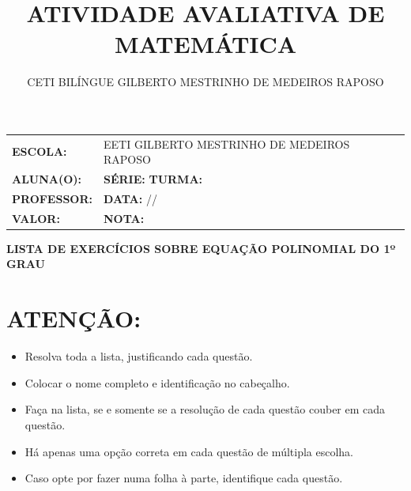 \documentclass[a4paper,12pt]{article}
\title{ATIVIDADE AVALIATIVA DE MATEMÁTICA}
\author{CETI BILÍNGUE GILBERTO MESTRINHO DE MEDEIROS RAPOSO}
\date{}
\begin{document}
	\Large
	\onehalfspacing
	\vspace{1cm}
	\begin{center}
    	\begin{tabularx}{\textwidth}{|l >{\raggedright\arraybackslash}X|}
        	\hline
        	\textbf{ESCOLA:} & EETI GILBERTO MESTRINHO DE MEDEIROS RAPOSO \\
        	\textbf{ALUNA(O):} & \underline{\hspace{5cm}} \textbf{SÉRIE:} \underline{\hspace{1cm}} \textbf{TURMA:} \underline{\hspace{1cm}} \\
        	\textbf{PROFESSOR:} & \underline{\hspace{5cm}} \textbf{DATA:} \underline{\hspace{1cm}}/\underline{\hspace{1.5cm}}/\underline{\hspace{1cm}} \\
        	\textbf{VALOR:} & \underline{\hspace{3cm}} \textbf{NOTA:} \underline{\hspace{2cm}} \\
        	\hline
    		\end{tabularx}
		\end{center}
		\vspace{1cm}
	
	\begin{center}
		\Large\textbf{LISTA DE EXERCÍCIOS SOBRE EQUAÇÃO POLINOMIAL DO 1º GRAU}
	\end{center}
	
	\vspace{0.5cm}
	
	\section*{ATENÇÃO:}
	\begin{itemize}[noitemsep]
		\item Resolva toda a lista, justificando cada questão.
		\item Colocar o nome completo e identificação no cabeçalho.
		\item Faça na lista, se e somente se a resolução de cada questão couber em cada questão.
		\item Há apenas uma opção correta em cada questão de múltipla escolha.
		\item Caso opte por fazer numa folha à parte, identifique cada questão.
	\end{itemize}
	
\end{document}
